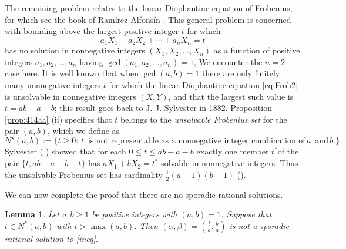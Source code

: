 \documentclass[12pt,letterpaper, reqno]{amsart}
\newtheorem{lem}[thm]{Lemma}
\theoremstyle{definition}
\theoremstyle{remark}
\begin{document}
The remaining problem relates  to the linear Diophantine equation of Frobenius, for which see
the book of   Ram\'{i}rez Alfons\'{i}n \cite{RA05}.
This general problem  is concerned with bounding above the largest positive  integer $t$ for which
\begin{equation}\label{Frobenius-eqn}
a_1 X_1 + a_2 X_2 + \cdots + a_n X_n = t
\end{equation}
has no solution in nonnegative integers $(X_1, X_2, ..., X_n)$
as a function of  positive integers $a_1, a_2, ... , a_n$ having $\gcd(a_1, a_2, ..., a_n) =1$,
We encounter  the $n=2$ case here.
It is well known  that when $\gcd(a, b)=1$  there are only
finitely many nonnegative integers $t$ for which the linear Diophantine equation \eqref{eq:Frob2} is unsolvable in nonnegative
integers $(X, Y)$, and  that the  largest such value is $t= ab -a -b$; this result goes back to J. J. Sylvester in 1882.
Proposition \ref{prop:414aa} (ii)  specifies that  $t$  belongs to  the  {\em unsolvable Frobenius set} for the pair $(a, b)$,
which we define as
$$
N^{\star}(a, b) := \{ t \ge 0: \, t \, \mbox{ is not representable as a nonnegative integer combination of}\,  a \, \mbox{ and} \, b.\}.
$$
  Sylvester (\cite{Sylvester:1882} \cite{Sylvester:1884})
 showed that  for  each $0\le t \le ab-a-b$  exactly one member $t^{*}$of the pair $\{ t, ab-a- b-t \}$ has $aX_1 + bX_2 =t^{*}$
  solvable in nonnegative integers. Thus the unsolvable Frobenius set
has cardinality $\frac{1}{2} (a-1)(b-1)$ (\cite[Theorem 5.1.1]{RA05}).

We can now complete the proof that  there are no sporadic rational solutions. 
\begin{lem}\label{lem:416}
Let $a, b \ge 1$ be positive integers with  $(a, b) =1$.
Suppose that $t\in N^{*}(a,b)$ with  $t>\max(a,b)$.
Then  $(\alpha, \beta) = (\frac{t}{a}, \frac{b}{a})$  is not a sporadic rational 
solution to \eqref{ineq}. 
\end{lem}
\end{document}
